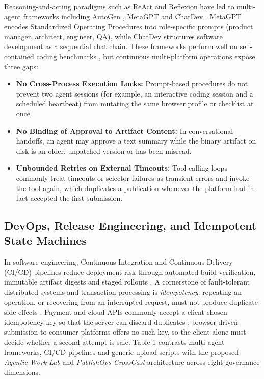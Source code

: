 \documentclass[11pt,a4paper]{article}
\theoremstyle{definition}
\begin{document}
Reasoning-and-acting paradigms such as ReAct \citep{Yao2023ReAct} and Reflexion \citep{Shinn2023Reflexion} have led to multi-agent frameworks including AutoGen \citep{Wu2023AutoGen}, MetaGPT \citep{Hong2023MetaGPT} and ChatDev \citep{Qian2024ChatDev}. MetaGPT encodes Standardized Operating Procedures into role-specific prompts (product manager, architect, engineer, QA), while ChatDev structures software development as a sequential chat chain. These frameworks perform well on self-contained coding benchmarks \citep{Wang2024Agent}, but continuous multi-platform operations expose three gaps:

\begin{itemize}[leftmargin=1.8em]
    \item \textbf{No Cross-Process Execution Locks:} Prompt-based procedures do not prevent two agent sessions (for example, an interactive coding session and a scheduled heartbeat) from mutating the same browser profile or checklist at once.
    \item \textbf{No Binding of Approval to Artifact Content:} In conversational handoffs, an agent may approve a text summary while the binary artifact on disk is an older, unpatched version or has been misread.
    \item \textbf{Unbounded Retries on External Timeouts:} Tool-calling loops commonly treat timeouts or selector failures as transient errors and invoke the tool again, which duplicates a publication whenever the platform had in fact accepted the first submission.
\end{itemize}

\subsection{DevOps, Release Engineering, and Idempotent State Machines}
\label{sec:2.3}

In software engineering, Continuous Integration and Continuous Delivery (CI/CD) pipelines reduce deployment risk through automated build verification, immutable artifact digests and staged rollouts \citep{Humble2010, Bass2015, Adams2016, Shahin2017, Leite2019}. A cornerstone of fault-tolerant distributed systems and transaction processing is \emph{idempotency}: repeating an operation, or recovering from an interrupted request, must not produce duplicate side effects \citep{Schneider1990, gray1992transaction, Kleppmann2017}. Payment and cloud APIs commonly accept a client-chosen idempotency key so that the server can discard duplicates \citep{Helland2012}; browser-driven submission to consumer platforms offers no such key, so the client alone must decide whether a second attempt is safe. Table 1 contrasts multi-agent frameworks, CI/CD pipelines and generic upload scripts with the proposed \emph{Agentic Work Lab} and \emph{PublishOps CrossCast} architecture across eight governance dimensions.
\end{document}
